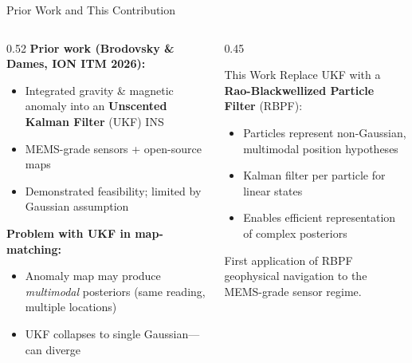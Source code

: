 \documentclass[aspectratio=169]{beamer}
\begin{document}
\begin{frame}{Prior Work and This Contribution}
    \begin{columns}
        \begin{column}{0.52\textwidth}
            \textbf{Prior work (Brodovsky \& Dames, ION ITM 2026):}
            \begin{itemize}
                \item Integrated gravity \& magnetic anomaly into an \textbf{Unscented Kalman Filter} (UKF) INS
                \item MEMS-grade sensors + open-source maps
                \item Demonstrated feasibility; limited by Gaussian assumption
            \end{itemize}
            \vspace{0.5em}
            \textbf{Problem with UKF in map-matching:}
            \begin{itemize}
                \item Anomaly map may produce \emph{multimodal} posteriors (same reading, multiple locations)
                \item UKF collapses to single Gaussian---can diverge
            \end{itemize}
        \end{column}
        \begin{column}{0.45\textwidth}
            \begin{alertblock}{This Work}
                Replace UKF with a \textbf{Rao-Blackwellized Particle Filter} (RBPF):
                \begin{itemize}
                    \item Particles represent non-Gaussian, multimodal position hypotheses
                    \item Kalman filter per particle for linear states
                    \item Enables efficient representation of complex posteriors
                \end{itemize}
            \end{alertblock}
            \vspace{0.3em}
            \small
            First application of RBPF geophysical navigation to the MEMS-grade sensor regime.
        \end{column}
    \end{columns}
\end{frame}
\end{document}

